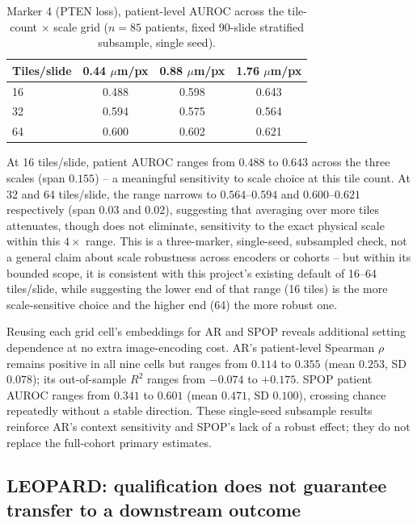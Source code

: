 \begin{table}[htbp]
\centering
\small
\begin{tabular}{lccc}
\toprule
Tiles/slide & 0.44 $\mu$m/px & 0.88 $\mu$m/px & 1.76 $\mu$m/px \\
\midrule
16 & 0.488 & 0.598 & 0.643 \\
32 & 0.594 & 0.575 & 0.564 \\
64 & 0.600 & 0.602 & 0.621 \\
\bottomrule
\end{tabular}
\caption{Marker 4 (PTEN loss), patient-level AUROC across the tile-count $\times$ scale grid
($n=85$ patients, fixed 90-slide stratified subsample, single seed).}
\label{tab:scale-sensitivity}
\end{table}

At 16 tiles/slide, patient AUROC ranges from $0.488$ to $0.643$ across the three scales (span
$0.155$) -- a meaningful sensitivity to scale choice at this tile count. At 32 and 64
tiles/slide, the range narrows to $0.564$--$0.594$ and $0.600$--$0.621$ respectively (span
$0.03$ and $0.02$), suggesting that averaging over more tiles attenuates, though does not
eliminate, sensitivity to the exact physical scale within this $4\times$ range. This is a
three-marker, single-seed, subsampled check, not a general claim about scale robustness across
encoders or cohorts -- but within its bounded scope, it is consistent with this project's
existing default of 16--64 tiles/slide, while suggesting the lower end of that range (16 tiles)
is the more scale-sensitive choice and the higher end (64) the more robust one.

Reusing each grid cell's embeddings for AR and SPOP reveals additional setting dependence at
no extra image-encoding cost. AR's patient-level Spearman $\rho$ remains positive in all nine
cells but ranges from $0.114$ to $0.355$ (mean $0.253$, SD $0.078$); its out-of-sample $R^2$
ranges from $-0.074$ to $+0.175$. SPOP patient AUROC ranges from $0.341$ to $0.601$ (mean
$0.471$, SD $0.100$), crossing chance repeatedly without a stable direction. These single-seed
subsample results reinforce AR's context sensitivity and SPOP's lack of a robust effect; they
do not replace the full-cohort primary estimates.

\subsection{LEOPARD: qualification does not guarantee transfer to a downstream outcome}
\label{sec:leopard-results}

